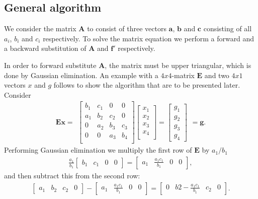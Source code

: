 \documentclass{emulateapj}
\begin{document}
\subsection{General algorithm}
We consider the matrix $\boldsymbol{A}$ to consist of three vectors $\boldsymbol{a}$, $\boldsymbol{b}$ and $\boldsymbol{c}$ consisting of all $a_i$, $b_i$ and $c_i$ respectively. To solve the matrix equation we perform a forward and a backward substitution of $\boldsymbol{A}$ and $\boldsymbol{f'}$ respectively.

In order to forward substitute $\boldsymbol{A}$, the matrix must be upper triangular, which is done by Gaussian elimination. An example with a $4x4$-matrix $\boldsymbol{E}$ and two $4x1$ vectors $x$ and $g$ follows to show the algorithm that are to be presented later. Consider 
%
\[ \boldsymbol{Ex} =
\begin{array}{c}
\begin{bmatrix}\label{eq:Au=f}
b_1     & c_1           & 0         & 0 \\
a_1     & b_2           & c_2       & 0       \\
0       & a_2           & b_3       & c_3    \\
0  &  0            & a_3       & b_4     \\
\end{bmatrix}
\begin{bmatrix}
x_1 \\
x_2 \\
x_3 \\
x_4 \\
\end{bmatrix}
=
\begin{bmatrix}
g_1 \\
g_2 \\
g_3 \\
g_4
\end{bmatrix}
\end{array}
= \boldsymbol{g}.
\]
%
Performing Gaussian elimination we multiply the first row of $\boldsymbol{E}$ by $a_1/b_1$
%
\begin{gather*}
    \frac{a_1}{b_1}\begin{bmatrix} b_1 & c_1 & 0 & 0 \end{bmatrix} =  \begin{bmatrix} a_1 & \frac{a_1 c_1}{b_1} & 0 & 0\end{bmatrix},
\end{gather*}
and then subtract this from the second row:
%
\begin{gather*}
    \begin{bmatrix} a_1 & b_2 & c_2 & 0 \end{bmatrix} - \begin{bmatrix} a_1 & \frac{a_1 c_1}{b_1} & 0 & 0\end{bmatrix} = \begin{bmatrix} 0 & b2 - \frac{a_1 c_1}{b_1} & c_2 & 0 \end{bmatrix}.
\end{gather*}
\end{document}
